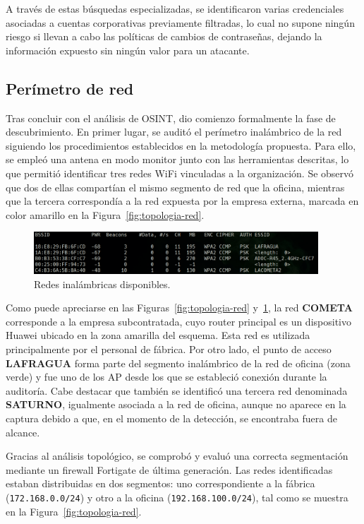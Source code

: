 \documentclass[a4paper, 11pt]{article}
\begin{document}
A través de estas búsquedas especializadas, se identificaron varias credenciales asociadas a cuentas corporativas previamente filtradas, lo cual no supone ningún riesgo si llevan a cabo las políticas de cambios de contraseñas, dejando la información expuesto sin ningún valor para un atacante.

\subsection*{Perímetro de red}

Tras concluir con el análisis de OSINT, dio comienzo formalmente la fase de descubrimiento. En primer lugar, se auditó el perímetro inalámbrico de la red siguiendo los procedimientos establecidos en la metodología propuesta. Para ello, se empleó una antena en modo monitor junto con las herramientas descritas, lo que permitió identificar tres redes WiFi vinculadas a la organización. Se observó que dos de ellas compartían el mismo segmento de red que la oficina, mientras que la tercera correspondía a la red expuesta por la empresa externa, marcada en color amarillo en la Figura~\ref{fig:topologia-red}.

\begin{figure}[H]
    \centering
    \includegraphics[width=0.95\textwidth]{images/wifis_disponibles.png}
    \caption{Redes inalámbricas disponibles.}
    \label{fig:redes-wifis}
\end{figure}

Como puede apreciarse en las Figuras~\ref{fig:topologia-red} y~\ref{fig:redes-wifis}, la red \textbf{COMETA} corresponde a la empresa subcontratada, cuyo router principal es un dispositivo Huawei ubicado en la zona amarilla del esquema. Esta red es utilizada principalmente por el personal de fábrica. Por otro lado, el punto de acceso \textbf{LAFRAGUA} forma parte del segmento inalámbrico de la red de oficina (zona verde) y fue uno de los AP desde los que se estableció conexión durante la auditoría. Cabe destacar que también se identificó una tercera red denominada \textbf{SATURNO}, igualmente asociada a la red de oficina, aunque no aparece en la captura debido a que, en el momento de la detección, se encontraba fuera de alcance.

Gracias al análisis topológico, se comprobó y evaluó una correcta segmentación mediante un firewall Fortigate de última generación. Las redes identificadas estaban distribuidas en dos segmentos: uno correspondiente a la fábrica (\texttt{172.168.0.0/24}) y otro a la oficina (\texttt{192.168.100.0/24}), tal como se muestra en la Figura~\ref{fig:topologia-red}. 
\end{document}
